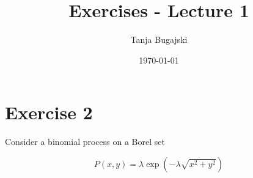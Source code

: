 \documentclass{article}
\title{Exercises - Lecture 1}
\author{Tanja Bugajski}
\date{\today}
\begin{document}
\maketitle

\section*{Exercise 2}
Consider a binomial process on a Borel set  

\[
P(x, y) = \lambda \exp(-\lambda \sqrt{x^2 + y^2})
\]
\end{document}
